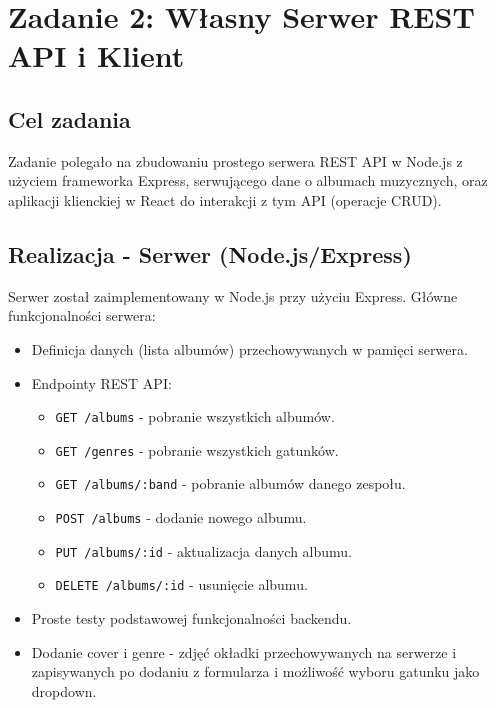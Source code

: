 \documentclass[11pt, a4paper]{article}
\begin{document}
\section{Zadanie 2: Własny Serwer REST API i Klient}
\subsection{Cel zadania}
Zadanie polegało na zbudowaniu prostego serwera REST API w Node.js z użyciem frameworka Express, serwującego dane o albumach muzycznych, oraz aplikacji klienckiej w React do interakcji z tym API (operacje CRUD).

\subsection{Realizacja - Serwer (Node.js/Express)}
Serwer został zaimplementowany w Node.js przy użyciu Express. Główne funkcjonalności serwera:
\begin{itemize}
    \item Definicja danych (lista albumów) przechowywanych w pamięci serwera.
    \item Endpointy REST API:
    \begin{itemize}
        \item \texttt{GET /albums} - pobranie wszystkich albumów.
        \item \texttt{GET /genres} - pobranie wszystkich gatunków.
        \item \texttt{GET /albums/:band} - pobranie albumów danego zespołu.
        \item \texttt{POST /albums} - dodanie nowego albumu.
        \item \texttt{PUT /albums/:id} - aktualizacja danych albumu.
        \item \texttt{DELETE /albums/:id} - usunięcie albumu.
    \end{itemize}
    \item Proste testy podstawowej funkcjonalności backendu.    
    \item Dodanie cover i genre - zdjęć okładki przechowywanych na serwerze i zapisywanych po dodaniu z formularza i możliwość wyboru gatunku jako dropdown. 
\end{itemize}
\end{document}
